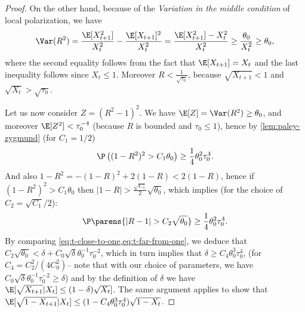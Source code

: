 \documentclass[11pt]{article}
\begin{document}
\begin{proof}
	On the other hand, because of the \emph{Variation in the middle condition} of local polarization, we have
	\begin{equation*}
		\Var(R^2) = \frac{\E[X_{t+1}^2]}{X_t^2}-\frac{\E[X_{t+1}]^2}{X_t^2}=\frac{\E[X_{t+1}^2] - X_t^2}{X_t^2} \geq \frac{\theta_0}{X_t^2} \geq \theta_0,
	\end{equation*}
	where the second equality follows from the fact that $\E[X_{t+1}]=X_t$ and the last inequality follows since $X_t \leq 1$.
	Moreover $R<\frac{1}{\sqrt{\tau_0}}$, because $\sqrt{X_{t+1}} < 1$ and $\sqrt{X_t} > \sqrt{\tau_0}$.
	
	Let us now consider $Z = (R^2 - 1)^2$. We have $\E[Z] = \Var(R^2) \geq \theta_0$, and moreover $\E [Z^2] < \tau_0^{-4}$
	(because $R$ is bounded and $\tau_0\le 1$), hence by \cref{lem:paley-zygmund} (for $C_1=1/2$)
	\begin{equation*}
		\P\left((1 - R^2)^2 > C_1 \theta_0\right) \geq \frac{1}{4} \theta_0^2 \tau_0^4.
	\end{equation*}
	And also $1 - R^2 = - (1-R)^2 + 2 (1-R) < 2 (1-R)$, hence if $(1 - R^2)^2 > C_1 \theta_0$ then $|1-R| > \frac{\sqrt{C_1}}{2} \sqrt{\theta_0}$, which implies (for the choice of $C_2=\sqrt{C_1}/2$): 
	\begin{equation}
		\P\parens{|R-1| > C_2 \sqrt{\theta_0}} \geq \frac{1}{4} \theta_0^2 \tau_0^4.
		\label{eq:t-far-from-one}
	\end{equation}
	By comparing \cref{eq:t-close-to-one,eq:t-far-from-one}, we deduce  that $C_2 \sqrt{\theta_0}<\delta + C_0 \sqrt{\delta} \theta_0^{-1} \tau_0^{-2}$, which in turn implies that $\delta \geq C_4 \theta_0^3\tau_0^4$,
	(for $C_4=C_2^2/(4C_0^2)$-- note that with our choice of parameters, we have $ C_0 \sqrt{\delta} \theta_0^{-1} \tau_0^{-2}\ge \delta$)
	and by the definition of $\delta$ we have $\E[\sqrt{X_{t+1}} | X_t] \le(1 - \delta) \sqrt{X_t}]$.
	The same argument applies to show that $\E[\sqrt{1 - X_{t+1}}|X_t] \leq (1 - C_4 \theta_0^3 \tau_0^4) \sqrt{1 - X_t}$.
	

\end{proof}
\end{document}
